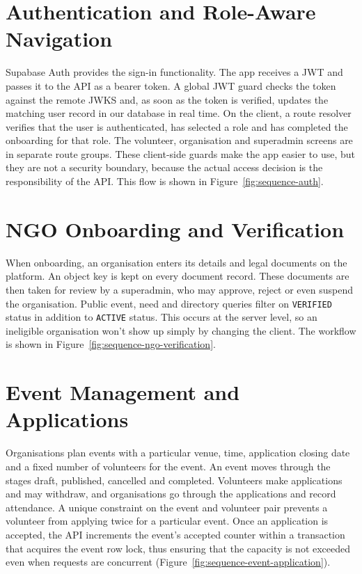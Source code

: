 \section{Authentication and Role-Aware Navigation}
\label{sec:impl-auth}
Supabase Auth provides the sign-in functionality. The app receives a JWT and passes it to the API as a bearer token. A global JWT guard checks the token against the remote JWKS and, as soon as the token is verified, updates the matching user record in our database in real time. On the client, a route resolver verifies that the user is authenticated, has selected a role and has completed the onboarding for that role. The volunteer, organisation and superadmin screens are in separate route groups. These client-side guards make the app easier to use, but they are not a security boundary, because the actual access decision is the responsibility of the API. This flow is shown in Figure~\ref{fig:sequence-auth}.


\section{NGO Onboarding and Verification}
\label{sec:impl-verification}
When onboarding, an organisation enters its details and legal documents on the platform. An object key is kept on every document record. These documents are then taken for review by a superadmin, who may approve, reject or even suspend the organisation. Public event, need and directory queries filter on \texttt{VERIFIED} status in addition to \texttt{ACTIVE} status. This occurs at the server level, so an ineligible organisation won't show up simply by changing the client. The workflow is shown in Figure~\ref{fig:sequence-ngo-verification}.


\section{Event Management and Applications}
\label{sec:impl-events}
Organisations plan events with a particular venue, time, application closing date and a fixed number of volunteers for the event. An event moves through the stages draft, published, cancelled and completed. Volunteers make applications and may withdraw, and organisations go through the applications and record attendance. A unique constraint on the event and volunteer pair prevents a volunteer from applying twice for a particular event. Once an application is accepted, the API increments the event's accepted counter within a transaction that acquires the event row lock, thus ensuring that the capacity is not exceeded even when requests are concurrent (Figure~\ref{fig:sequence-event-application}).

